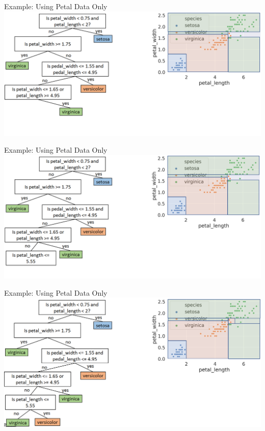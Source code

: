\documentclass[aspectratio=169]{../latex_main/tntbeamer}  %
\begin{document}
	
	\begin{frame}{Example: Using Petal Data Only}
	        \includegraphics[scale=.34]{Bild13}
	\end{frame}
	
	
	\begin{frame}{Example: Using Petal Data Only}
	        \includegraphics[scale=.34]{Bild14}
	\end{frame}
	
	
	\begin{frame}{Example: Using Petal Data Only}
	        \includegraphics[scale=.34]{Bild15}
	\end{frame}
	
\end{document}
